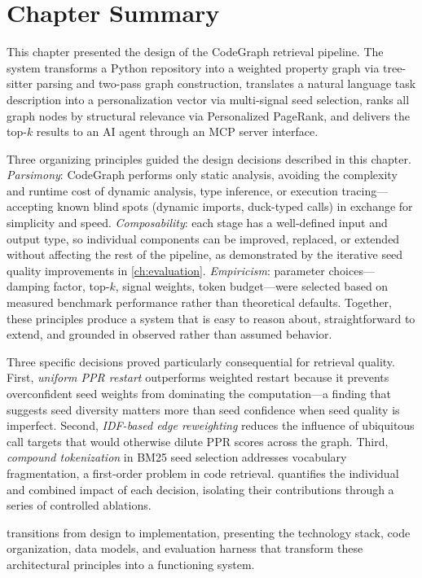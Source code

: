 \section{Chapter Summary}
\label{sec:design-summary}

This chapter presented the design of the CodeGraph retrieval pipeline. The system transforms a Python repository into a weighted property graph via tree-sitter parsing and two-pass graph construction, translates a natural language task description into a personalization vector via multi-signal seed selection, ranks all graph nodes by structural relevance via Personalized PageRank, and delivers the top-$k$ results to an AI agent through an MCP server interface.

Three organizing principles guided the design decisions described in this chapter. \emph{Parsimony}: CodeGraph performs only static analysis, avoiding the complexity and runtime cost of dynamic analysis, type inference, or execution tracing---accepting known blind spots (dynamic imports, duck-typed calls) in exchange for simplicity and speed. \emph{Composability}: each stage has a well-defined input and output type, so individual components can be improved, replaced, or extended without affecting the rest of the pipeline, as demonstrated by the iterative seed quality improvements in \cref{ch:evaluation}. \emph{Empiricism}: parameter choices---damping factor, top-$k$, signal weights, token budget---were selected based on measured benchmark performance rather than theoretical defaults. Together, these principles produce a system that is easy to reason about, straightforward to extend, and grounded in observed rather than assumed behavior.

Three specific decisions proved particularly consequential for retrieval quality. First, \emph{uniform PPR restart} outperforms weighted restart because it prevents overconfident seed weights from dominating the computation---a finding that suggests seed diversity matters more than seed confidence when seed quality is imperfect. Second, \emph{IDF-based edge reweighting} reduces the influence of ubiquitous call targets that would otherwise dilute PPR scores across the graph. Third, \emph{compound tokenization} in BM25 seed selection addresses vocabulary fragmentation, a first-order problem in code retrieval.  quantifies the individual and combined impact of each decision, isolating their contributions through a series of controlled ablations.

 transitions from design to implementation, presenting the technology stack, code organization, data models, and evaluation harness that transform these architectural principles into a functioning system.